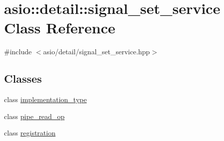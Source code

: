 \hypertarget{classasio_1_1detail_1_1signal__set__service}{}\section{asio\+:\+:detail\+:\+:signal\+\_\+set\+\_\+service Class Reference}
\label{classasio_1_1detail_1_1signal__set__service}


{\ttfamily \#include $<$asio/detail/signal\+\_\+set\+\_\+service.\+hpp$>$}

\subsection*{Classes}
\begin{DoxyCompactItemize}
\item 
class \hyperlink{classasio_1_1detail_1_1signal__set__service_1_1implementation__type}{implementation\+\_\+type}
\item 
class \hyperlink{classasio_1_1detail_1_1signal__set__service_1_1pipe__read__op}{pipe\+\_\+read\+\_\+op}
\item 
class \hyperlink{classasio_1_1detail_1_1signal__set__service_1_1registration}{registration}
\end{DoxyCompactItemize}
